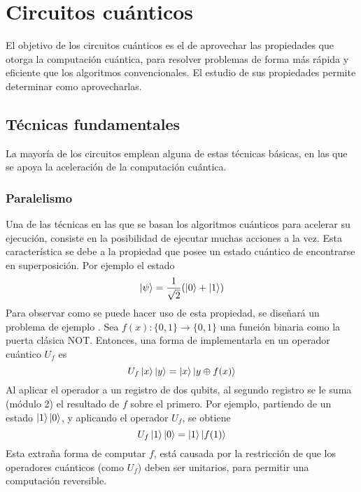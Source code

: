 \chapter{Circuitos cuánticos}
El objetivo de los circuitos cuánticos es el de aprovechar las propiedades que 
otorga la computación cuántica, para resolver problemas de forma más rápida y 
eficiente que los algoritmos convencionales. El estudio de sus propiedades 
permite determinar como aprovecharlas.

\section{Técnicas fundamentales}
La mayoría de los circuitos emplean alguna de estas técnicas básicas, en las que 
se apoya la aceleración de la computación cuántica.

\subsection{Paralelismo}
Una de las técnicas en las que se basan los algoritmos cuánticos para acelerar 
su ejecución, consiste en la posibilidad de ejecutar muchas acciones a la vez.  
Esta característica se debe a la propiedad que posee un estado cuántico de 
encontrarse en superposición. Por ejemplo el estado
%
$$ \ket{\psi} = \frac{1}{\sqrt 2}(\ket{0} + \ket{1}) $$
%
Para observar como se puede hacer uso de esta propiedad, se diseñará un problema 
de ejemplo \cite{nielsen00}. Sea $f(x): \{0,1\} \rightarrow \{0,1\}$ una función 
binaria como la puerta clásica NOT. Entonces, una forma de implementarla en un 
operador cuántico $U_f$ es
%
$$ U_f \ket{x}\ket{y} = \ket{x}\ket{y \oplus f(x)} $$
%
Al aplicar el operador a un registro de dos qubits, al segundo registro se le 
suma (módulo 2) el resultado de $f$ sobre el primero. Por ejemplo, partiendo de 
un estado $\ket{1}\ket{0}$, y aplicando el operador $U_f$, se obtiene
%
$$ U_f \ket{1}\ket{0} = \ket{1}\ket{f(1)} $$
%
Esta extraña forma de computar $f$, está causada por la restricción de que los 
operadores cuánticos (como $U_f$) deben ser unitarios, para permitir una 
computación reversible.

